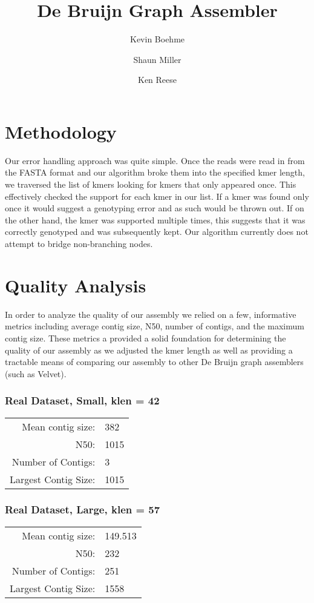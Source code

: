 \documentclass[12pt]{article}
\title{De Bruijn Graph Assembler}
\author{Kevin Boehme \and Shaun Miller \and Ken Reese}
\begin{document}
\maketitle

\section{Methodology}
Our error handling approach was quite simple. Once the reads were read in from the FASTA format and our algorithm broke them into the specified kmer length, we traversed the list of kmers looking for kmers that only appeared once. This effectively checked the support for each kmer in our list. If a kmer was found only once it would suggest a genotyping error and as such would be thrown out. If on the other hand, the kmer was supported multiple times, this suggests that it was correctly genotyped and was subsequently kept.  Our algorithm currently does not attempt to bridge non-branching nodes.

\section{Quality Analysis}
In order to analyze the quality of our assembly we relied on a few, informative metrics including average contig size, N50, number of contigs, and the maximum contig size. These metrics a provided a solid foundation for determining the quality of our assembly as we adjusted the kmer length as well as providing a tractable means of comparing our assembly to other De Bruijn graph assemblers (such as Velvet).

\begin{center}

\subsubsection*{Real Dataset, Small, klen = 42}

\begin{tabular}{rl} \hline
Mean contig size: & 382 \\
N50: & 1015 \\
Number of Contigs: & 3\\
Largest Contig Size: & 1015\\
\end{tabular}

\subsubsection*{Real Dataset, Large, klen = 57}

\begin{tabular}{rl} \hline
Mean contig size: & 149.513 \\
N50: &  232\\
Number of Contigs: & 251\\
Largest Contig Size: & 1558\\
\end{tabular}

\end{center}
\end{document}
